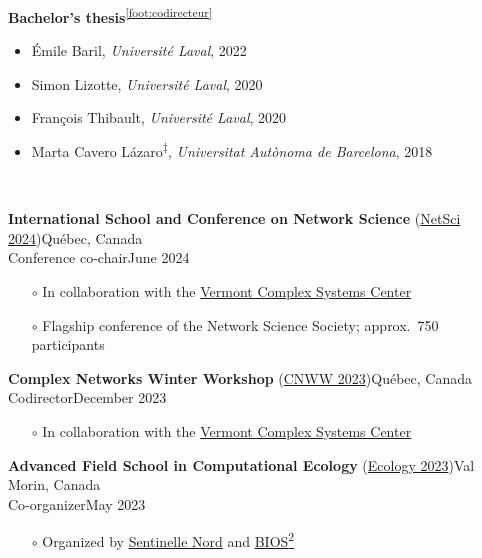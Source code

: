 \documentclass[11pt]{article}
\newcommand{\TitreSection}[1]{\colorbox{background}{\makebox[\textwidth-0.5em][c]{\Large\textrm{\textsc{#1}}}}\vspace{0.75\baselineskip}\\}
\begin{document}
%
%
%
\textbf{Bachelor's thesis}\textsuperscript{\ref{foot:codirecteur}}
%
\begin{itemize}
  \item Émile Baril, \textit{Universit\'e Laval}, 2022
  \item Simon Lizotte, \textit{Universit\'e Laval}, 2020
  \item Fran\c{c}ois Thibault, \textit{Universit\'e Laval}, 2020
  \item Marta Cavero L\'azaro\textsuperscript{$\ddagger$}, \textit{Universitat Aut\`onoma de Barcelona}, 2018
\end{itemize} \vspace{0.75\baselineskip}
%
%
%
%
%
\TitreSection{Organizing Activities}
%
\parbox{\textwidth}{%
\textbf{International School and Conference on Network Science} (\href{https://netscisociety.net/events/netsci}{NetSci 2024})\hfill Qu\'ebec, Canada\\
Conference co-chair\hfill June 2024
\begin{itemize}[leftmargin=1.5em]\small
  \item[$\circ$] In collaboration with the \href{https://vermontcomplexsystems.org/}{Vermont Complex Systems Center}
  \item[$\circ$] Flagship conference of the Network Science Society; approx.~750 participants
\end{itemize}}
%
\parbox{\textwidth}{%
\textbf{Complex Networks Winter Workshop} (\href{https://vermontcomplexsystems.org/events/cnww/}{CNWW 2023})\hfill Qu\'ebec, Canada\\
Codirector\hfill December 2023
\begin{itemize}[leftmargin=1.5em]\small
  \item[$\circ$] In collaboration with the \href{https://vermontcomplexsystems.org/}{Vermont Complex Systems Center}
\end{itemize}}
%
\parbox{\textwidth}{%
\textbf{Advanced Field School in Computational Ecology} (\href{https://sentinellenord.ulaval.ca/en/ecology2023}{Ecology 2023})\hfill Val Morin, Canada\\
Co-organizer\hfill May 2023
\begin{itemize}[leftmargin=1.5em]\small
  \item[$\circ$] Organized by \href{http://sentinellenord.ulaval.ca/}{Sentinelle Nord} and \href{https://bios2.usherbrooke.ca/}{BIOS\textsuperscript{2}}
\end{itemize}}
\end{document}
